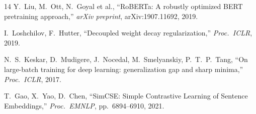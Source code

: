 \documentclass[10pt,a4paper,twocolumn]{article}
\begin{document}
\begin{thebibliography}{14}
Y.\ Liu, M.\ Ott, N.\ Goyal et al.,
``RoBERTa: A robustly optimized BERT pretraining approach,''
\textit{arXiv preprint}, arXiv:1907.11692, 2019.

I.\ Loshchilov, F.\ Hutter,
``Decoupled weight decay regularization,''
\textit{Proc.\ ICLR}, 2019.

N.\ S.\ Keskar, D.\ Mudigere, J.\ Nocedal, M.\ Smelyanskiy, P.\ T.\ P.\ Tang,
``On large-batch training for deep learning: generalization gap and sharp minima,''
\textit{Proc.\ ICLR}, 2017.

T.\ Gao, X.\ Yao, D.\ Chen,
``SimCSE: Simple Contrastive Learning of Sentence Embeddings,''
\textit{Proc.\ EMNLP}, pp.~6894--6910, 2021.

\end{thebibliography}
\end{document}
